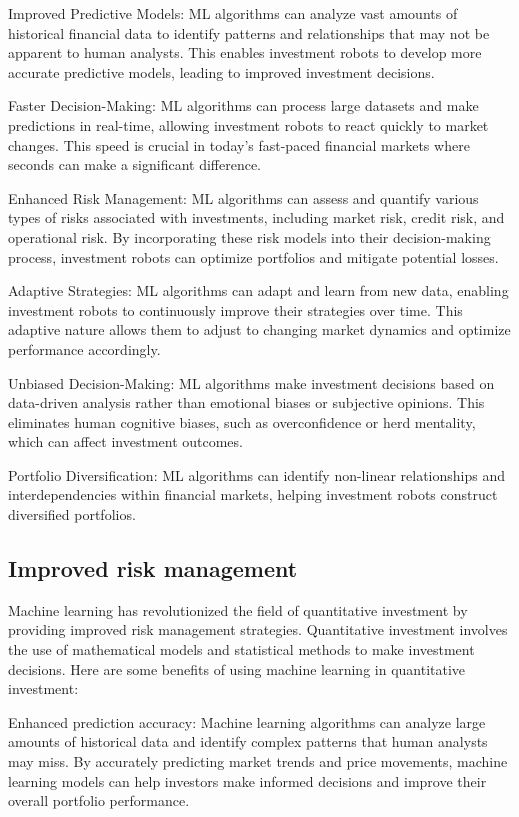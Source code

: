 \documentclass[UTF8]{ctexart}
\begin{document}
Improved Predictive Models: ML algorithms can analyze vast amounts of historical financial data to identify patterns and relationships that may not be apparent to human analysts. This enables investment robots to develop more accurate predictive models, leading to improved investment decisions.

Faster Decision-Making: ML algorithms can process large datasets and make predictions in real-time, allowing investment robots to react quickly to market changes. This speed is crucial in today's fast-paced financial markets where seconds can make a significant difference.

Enhanced Risk Management: ML algorithms can assess and quantify various types of risks associated with investments, including market risk, credit risk, and operational risk. By incorporating these risk models into their decision-making process, investment robots can optimize portfolios and mitigate potential losses.

Adaptive Strategies: ML algorithms can adapt and learn from new data, enabling investment robots to continuously improve their strategies over time. This adaptive nature allows them to adjust to changing market dynamics and optimize performance accordingly.

Unbiased Decision-Making: ML algorithms make investment decisions based on data-driven analysis rather than emotional biases or subjective opinions. This eliminates human cognitive biases, such as overconfidence or herd mentality, which can affect investment outcomes.

Portfolio Diversification: ML algorithms can identify non-linear relationships and interdependencies within financial markets, helping investment robots construct diversified portfolios.

\subsection{Improved risk management}
Machine learning has revolutionized the field of quantitative investment by providing improved risk management strategies. Quantitative investment involves the use of mathematical models and statistical methods to make investment decisions. Here are some benefits of using machine learning in quantitative investment:

Enhanced prediction accuracy: Machine learning algorithms can analyze large amounts of historical data and identify complex patterns that human analysts may miss. By accurately predicting market trends and price movements, machine learning models can help investors make informed decisions and improve their overall portfolio performance.
\end{document}
